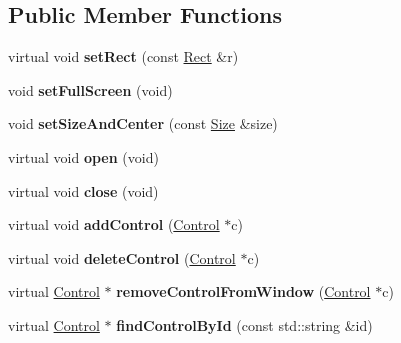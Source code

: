 \subsection*{Public Member Functions}
\begin{DoxyCompactItemize}
\item 
virtual void {\bfseries set\+Rect} (const \hyperlink{classRect}{Rect} \&r)\hypertarget{classWindow_a2296d6c162216d437c1f9b2107dfa9b7}{}\label{classWindow_a2296d6c162216d437c1f9b2107dfa9b7}

\item 
void {\bfseries set\+Full\+Screen} (void)\hypertarget{classWindow_ad8521c34a5c325ac991c59a5a66d25a5}{}\label{classWindow_ad8521c34a5c325ac991c59a5a66d25a5}

\item 
void {\bfseries set\+Size\+And\+Center} (const \hyperlink{structSize}{Size} \&size)\hypertarget{classWindow_a736211035eb0323d070ccee5d5e74e6a}{}\label{classWindow_a736211035eb0323d070ccee5d5e74e6a}

\item 
virtual void {\bfseries open} (void)\hypertarget{classWindow_a121af073df9703a6d39a77bb8e57c6ab}{}\label{classWindow_a121af073df9703a6d39a77bb8e57c6ab}

\item 
virtual void {\bfseries close} (void)\hypertarget{classWindow_af939ce62f5fd60c6ec88d5151fc881c6}{}\label{classWindow_af939ce62f5fd60c6ec88d5151fc881c6}

\item 
virtual void {\bfseries add\+Control} (\hyperlink{classControl}{Control} $\ast$c)\hypertarget{classWindow_a82c47ffbdec3191e58a0d9374d2f4449}{}\label{classWindow_a82c47ffbdec3191e58a0d9374d2f4449}

\item 
virtual void {\bfseries delete\+Control} (\hyperlink{classControl}{Control} $\ast$c)\hypertarget{classWindow_ac5ac0113bd19eaadc65542ade8b18695}{}\label{classWindow_ac5ac0113bd19eaadc65542ade8b18695}

\item 
virtual \hyperlink{classControl}{Control} $\ast$ {\bfseries remove\+Control\+From\+Window} (\hyperlink{classControl}{Control} $\ast$c)\hypertarget{classWindow_a5ec9715d6c17c521cda596e2161511fa}{}\label{classWindow_a5ec9715d6c17c521cda596e2161511fa}

\item 
virtual \hyperlink{classControl}{Control} $\ast$ {\bfseries find\+Control\+By\+Id} (const std\+::string \&id)\hypertarget{classWindow_ae67eb184d336bce04f436e290a807cfb}{}\label{classWindow_ae67eb184d336bce04f436e290a807cfb}


\end{DoxyCompactItemize}
